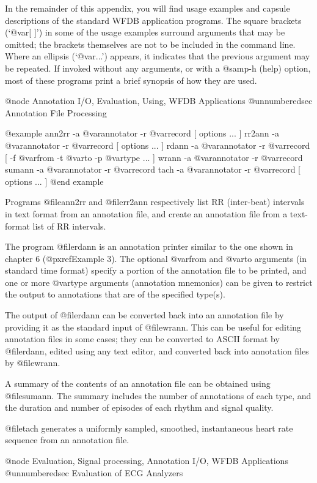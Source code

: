 {{{{{{{{{In the remainder of this appendix, you will find usage examples and
capsule descriptions of the standard WFDB application programs.  The
square brackets (`@var{[ ]}') in some of the usage examples surround
arguments that may be omitted;  the brackets themselves are not
to be included in the command line.  Where an ellipsis (`@var{...}')
appears, it indicates that the previous argument may be repeated.
If invoked without any arguments, or with a @samp{-h} (help) option, most of
these programs print a brief synopsis of how they are used.

@node     Annotation I/O, Evaluation, Using, WFDB Applications
@unnumberedsec Annotation File Processing

@example
ann2rr -a @var{annotator} -r @var{record [ options ... ]}
rr2ann -a @var{annotator} -r @var{record [ options ... ]}
rdann -a @var{annotator} -r @var{record [} -f @var{from} -t @var{to} -p @var{type ... ]}
wrann -a @var{annotator} -r @var{record}
sumann -a @var{annotator} -r @var{record}
tach -a @var{annotator} -r @var{record [ options ... ]}
@end example

Programs @file{ann2rr} and @file{rr2ann} respectively list RR (inter-beat)
intervals in text format from an annotation file, and create an annotation
file from a text-format list of RR intervals.

The program @file{rdann} is an annotation printer similar to the one
shown in chapter 6 (@pxref{Example 3}).  The optional @var{from} and
@var{to} arguments (in standard time format) specify a portion of the
annotation file to be printed, and one or more @var{type} arguments
(annotation mnemonics) can be given to restrict the output to
annotations that are of the specified type(s).

The output of @file{rdann} can be converted back into an annotation file
by providing it as the standard input of @file{wrann}.  This can be
useful for editing annotation files in some cases;  they can be
converted to ASCII format by @file{rdann}, edited using any text editor,
and converted back into annotation files by @file{wrann}.

A summary of the contents of an annotation file can be obtained using
@file{sumann}.  The summary includes the number of annotations of each
type, and the duration and number of episodes of each rhythm and signal
quality.

@file{tach} generates a uniformly sampled, smoothed, instantaneous heart
rate sequence from an annotation file.

@node     Evaluation, Signal processing, Annotation I/O, WFDB Applications
@unnumberedsec Evaluation of ECG Analyzers

}}}}}}}}}
